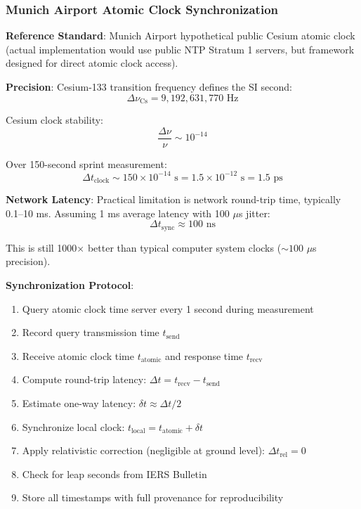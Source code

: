 \documentclass[11pt,onecolumn]{article}
\begin{document}
\subsubsection{Munich Airport Atomic Clock Synchronization}

\textbf{Reference Standard}: Munich Airport hypothetical public Cesium atomic clock (actual implementation would use public NTP Stratum 1 servers, but framework designed for direct atomic clock access).

\textbf{Precision}: Cesium-133 transition frequency defines the SI second:
\begin{equation}
\Delta \nu_{\text{Cs}} = 9,192,631,770 \text{ Hz}
\end{equation}

Cesium clock stability:
\begin{equation}
\frac{\Delta \nu}{\nu} \sim 10^{-14}
\end{equation}

Over 150-second sprint measurement:
\begin{equation}
\Delta t_{\text{clock}} \sim 150 \times 10^{-14} \text{ s} = 1.5 \times 10^{-12} \text{ s} = 1.5 \text{ ps}
\end{equation}

\textbf{Network Latency}: Practical limitation is network round-trip time, typically 0.1--10 ms. Assuming 1 ms average latency with 100 $\mu$s jitter:
\begin{equation}
\Delta t_{\text{sync}} \approx 100 \text{ ns}
\end{equation}

This is still 1000$\times$ better than typical computer system clocks ($\sim 100$ $\mu$s precision).

\textbf{Synchronization Protocol}:
\begin{enumerate}
\item Query atomic clock time server every 1 second during measurement
\item Record query transmission time $t_{\text{send}}$
\item Receive atomic clock time $t_{\text{atomic}}$ and response time $t_{\text{recv}}$
\item Compute round-trip latency: $\Delta t = t_{\text{recv}} - t_{\text{send}}$
\item Estimate one-way latency: $\delta t \approx \Delta t / 2$
\item Synchronize local clock: $t_{\text{local}} = t_{\text{atomic}} + \delta t$
\item Apply relativistic correction (negligible at ground level): $\Delta t_{\text{rel}} = 0$
\item Check for leap seconds from IERS Bulletin
\item Store all timestamps with full provenance for reproducibility
\end{enumerate}
\end{document}
